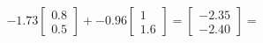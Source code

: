 \documentclass[preview]{standalone}
\begin{document}
\begin{align*}
-1.73 \begin{bmatrix} 0.8 \\ 0.5 \end{bmatrix} + -0.96 \begin{bmatrix} 1 \\ 1.6 \end{bmatrix} = \begin{bmatrix} -2.35 \\ -2.40 \end{bmatrix} =
\end{align*}
\end{document}
